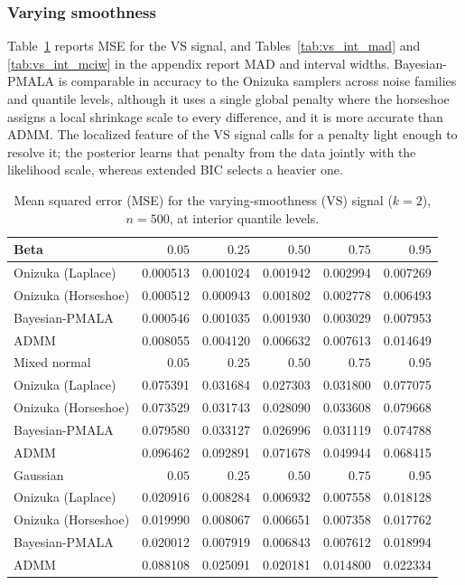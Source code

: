 \subsubsection{Varying smoothness}
\label{sec:sim:ind:vs}

Table~\ref{tab:vs_int_mse} reports MSE for the VS signal, and Tables~\ref{tab:vs_int_mad} and \ref{tab:vs_int_mciw} in the appendix report MAD and interval widths. Bayesian-PMALA is comparable in accuracy to the Onizuka samplers across noise families and quantile levels, although it uses a single global penalty where the horseshoe assigns a local shrinkage scale to every difference, and it is more accurate than ADMM. The localized feature of the VS signal calls for a penalty light enough to resolve it; the posterior learns that penalty from the data jointly with the likelihood scale, whereas extended BIC selects a heavier one.

\begin{table}[!htbp]
\centering
\small
\caption{Mean squared error (MSE) for the varying-smoothness (VS) signal ($k=2$), $n=500$, at interior quantile levels.}
\label{tab:vs_int_mse}
\begin{tabular}{lrrrrr}
\toprule
Beta & $0.05$ & $0.25$ & $0.50$ & $0.75$ & $0.95$ \\
\midrule
Onizuka (Laplace) & 0.000513 & 0.001024 & 0.001942 & 0.002994 & 0.007269 \\
Onizuka (Horseshoe) & 0.000512 & 0.000943 & 0.001802 & 0.002778 & 0.006493 \\
Bayesian-PMALA & 0.000546 & 0.001035 & 0.001930 & 0.003029 & 0.007953 \\
ADMM & 0.008055 & 0.004120 & 0.006632 & 0.007613 & 0.014649 \\
\midrule
Mixed normal & $0.05$ & $0.25$ & $0.50$ & $0.75$ & $0.95$ \\
\midrule
Onizuka (Laplace) & 0.075391 & 0.031684 & 0.027303 & 0.031800 & 0.077075 \\
Onizuka (Horseshoe) & 0.073529 & 0.031743 & 0.028090 & 0.033608 & 0.079668 \\
Bayesian-PMALA & 0.079580 & 0.033127 & 0.026996 & 0.031119 & 0.074788 \\
ADMM & 0.096462 & 0.092891 & 0.071678 & 0.049944 & 0.068415 \\
\midrule
Gaussian & $0.05$ & $0.25$ & $0.50$ & $0.75$ & $0.95$ \\
\midrule
Onizuka (Laplace) & 0.020916 & 0.008284 & 0.006932 & 0.007558 & 0.018128 \\
Onizuka (Horseshoe) & 0.019990 & 0.008067 & 0.006651 & 0.007358 & 0.017762 \\
Bayesian-PMALA & 0.020012 & 0.007919 & 0.006843 & 0.007612 & 0.018994 \\
ADMM & 0.088108 & 0.025091 & 0.020181 & 0.014800 & 0.022334 \\
\bottomrule
\end{tabular}
\end{table}

